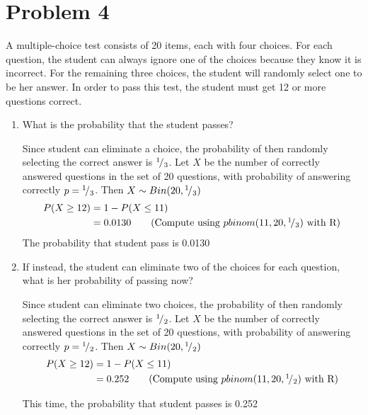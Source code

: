 \documentclass[11pt]{article}
\begin{document}
\pagebreak

\section*{Problem 4}
 A multiple-choice test consists of 20 items, each with four choices. For each question, the student can always ignore one of the choices because they know it is incorrect. For the remaining three choices, the student will randomly select one to be her answer. In order to pass this test, the student must get 12 or more questions correct.

 \begin{enumerate}
   \item What is the probability that the student passes?
   \begin{solution}
     $ $\\
     Since student can eliminate a choice, the probability of then randomly selecting the correct answer is ${}^{1}\!/_{3}$. Let $X$ be the number of correctly answered questions in the set of 20 questions, with probability of answering correctly $p={}^{1}\!/_{3}$. Then $X\sim Bin(20, {}^{1}\!/_{3})$
     \begin{align*}
      P(X\geq 12) &= 1-P(X\leq 11)\\
      &=  0.0130 \tag{Compute using $pbinom(11,20, \rfrac{1}{3})$ with R}
    \end{align*}
    The probability that student pass is 0.0130
   \end{solution}
   \item If instead, the student can eliminate two of the choices for each question, what is her probability of passing now?
   \begin{solution}
     $ $\\
     Since student can eliminate two choices, the probability of then randomly selecting the correct answer is ${}^{1}\!/_{2}$. Let $X$ be the number of correctly answered questions in the set of 20 questions, with probability of answering correctly $p={}^{1}\!/_{2}$. Then $X\sim Bin(20, {}^{1}\!/_{2})$
     \begin{align*}
      P(X\geq 12) &= 1-P(X\leq 11)\\
      &=  0.252 \tag{Compute using $pbinom(11,20, \rfrac{1}{2})$ with R}
    \end{align*}
   \end{solution}
   This time, the probability that student passes is 0.252
 \end{enumerate}
\pagebreak
\end{document}
